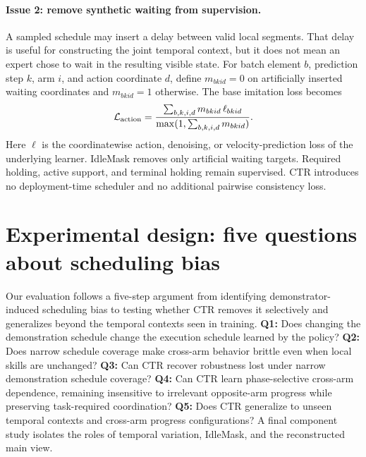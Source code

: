 \documentclass{article}
\newcommand{\method}{CTR}
\begin{document}
\paragraph{Issue 2: remove synthetic waiting from supervision.}
A sampled schedule may insert a delay between valid local segments. That delay is useful for constructing the joint temporal context, but it does not mean an expert chose to wait in the resulting visible state. For batch element $b$, prediction step $k$, arm $i$, and action coordinate $d$, define $m_{bkid}=0$ on artificially inserted waiting coordinates and $m_{bkid}=1$ otherwise. The base imitation loss becomes
\begin{equation}
 \mathcal L_{\rm action}
 =\frac{\sum_{b,k,i,d}m_{bkid}\,\ell_{bkid}}
        {\max(1,\sum_{b,k,i,d}m_{bkid})}.
 \label{eq:loss}
\end{equation}
Here $\ell$ is the coordinatewise action, denoising, or velocity-prediction loss of the underlying learner. IdleMask removes only artificial waiting targets. Required holding, active support, and terminal holding remain supervised. \method{} introduces no deployment-time scheduler and no additional pairwise consistency loss.

\section{Experimental design: five questions about scheduling bias}
Our evaluation follows a five-step argument from identifying demonstrator-induced scheduling bias to testing whether \method{} removes it selectively and generalizes beyond the temporal contexts seen in training. \textbf{Q1:} Does changing the demonstration schedule change the execution schedule learned by the policy? \textbf{Q2:} Does narrow schedule coverage make cross-arm behavior brittle even when local skills are unchanged? \textbf{Q3:} Can \method{} recover robustness lost under narrow demonstration schedule coverage? \textbf{Q4:} Can \method{} learn phase-selective cross-arm dependence, remaining insensitive to irrelevant opposite-arm progress while preserving task-required coordination? \textbf{Q5:} Does \method{} generalize to unseen temporal contexts and cross-arm progress configurations? A final component study isolates the roles of temporal variation, IdleMask, and the reconstructed main view.
\end{document}
